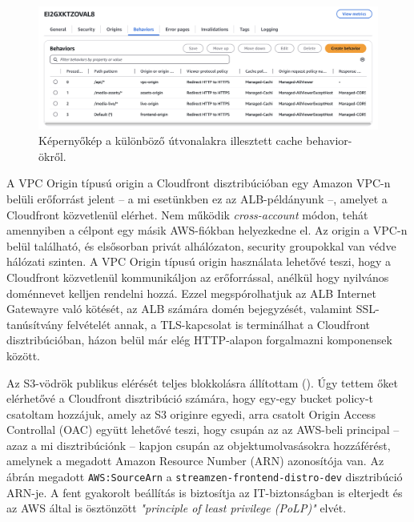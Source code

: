 \begin{figure}[ht]
  \centering
  \includegraphics[width=150mm, keepaspectratio]{figures/distro_behav.png}
  \caption{Képernyőkép a különböző útvonalakra illesztett cache behavior-ökről.}
  \label{fig:behav}
\end{figure}

A VPC Origin típusú origin a Cloudfront disztribúcióban egy Amazon VPC-n belüli erőforrást jelent -- a mi esetünkben ez az ALB-példányunk --, amelyet a Cloudfront közvetlenül elérhet. Nem működik \emph{cross-account} módon, tehát amennyiben a célpont egy másik AWS-fiókban helyezkedne el. Az origin a VPC-n belül található, és elsősorban privát alhálózaton, security groupokkal van védve hálózati szinten. A VPC Origin típusú origin használata lehetővé teszi, hogy a Cloudfront közvetlenül kommunikáljon az erőforrással, anélkül hogy nyilvános doménnevet kelljen rendelni hozzá. Ezzel megspórolhatjuk az ALB Internet Gatewayre való kötését, az ALB számára domén bejegyzését, valamint SSL-tanúsítvány felvételét annak, a TLS-kapcsolat is terminálhat a Cloudfront disztribúcióban, házon belül már elég HTTP-alapon forgalmazni komponensek között.

Az S3-vödrök publikus elérését teljes blokkolásra állítottam (). Úgy tettem őket elérhetővé a Cloudfront disztribúció számára, hogy egy-egy bucket policy-t csatoltam hozzájuk, amely az S3 originre egyedi, arra csatolt Origin Access Controllal (OAC)\cite{oac} együtt lehetővé teszi, hogy csupán az az AWS-beli principal -- azaz a mi disztribúciónk -- kapjon csupán az objektumolvasásokra hozzáférést, amelynek a megadott Amazon Resource Number (ARN) azonosítója van. Az ábrán megadott \verb|AWS:SourceArn| a \verb|streamzen-frontend-distro-dev| disztribúció ARN-je. A fent gyakorolt beállítás is biztosítja az IT-biztonságban is elterjedt és az AWS által is ösztönzött \emph{"principle of least privilege (PoLP)"} elvét.

